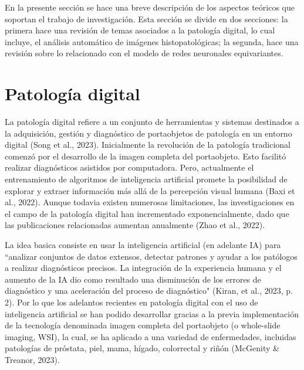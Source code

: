 \documentclass[12pt,letterpaper,final, openany]{scrbook}
\begin{document}

En la presente sección se hace una breve descripción de los aspectos teóricos que soportan el trabajo de investigación. Esta sección se divide en dos secciones: la primera hace una revisión de temas asociados a la patología digital, lo cual incluye, el análisis automático de imágenes histopatológicas; la segunda, hace una revisión sobre lo relacionado con el modelo de redes neuronales equivariantes.

\section{Patología digital}

La patología digital refiere a un conjunto de herramientas y sistemas destinados a la adquisición, gestión y diagnóstico de portaobjetos de patología en un entorno digital (Song et al., 2023). Inicialmente la revolución de la patología tradicional comenzó por el desarrollo de la imagen completa del portaobjeto. Esto facilitó realizar diagnósticos asistidos por computadora. Pero, actualmente el entrenamiento de algoritmos de inteligencia artificial promete la posibilidad de explorar y extraer información más allá de la percepción visual humana (Baxi et al., 2022). Aunque todavia existen numerosas limitaciones, las investigaciones en el campo de la patología digital han incrementado exponencialmente, dado que las publicaciones relacionadas aumentan anualmente (Zhao et al., 2022). 

La idea basica consiste en usar la inteligencia artificial (en adelante IA) para ``analizar conjuntos de datos extensos, detectar patrones y ayudar a los patólogos a realizar diagnósticos precisos. La integración de la experiencia humana y el aumento de la IA dio como resultado una disminución de los errores de diagnóstico y una aceleración del proceso de diagnóstico"  (Kiran, et al., 2023, p. 2). Por lo que los adelantos recientes en patología digital con el uso de inteligencia artificial se han podido desarrollar gracias a la previa implementación de la tecnología denominada imagen completa del portaobjeto (o whole-slide imaging, WSI), la cual, se ha aplicado a una variedad de enfermedades, incluidas patologías de próstata, piel, mama, hígado, colorrectal y riñón (McGenity \& Treanor, 2023).
\end{document}

